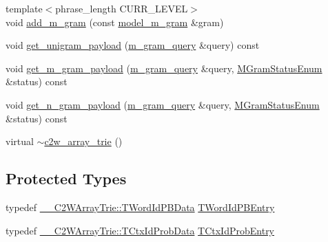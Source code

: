 \begin{DoxyCompactItemize}
\item 
{\footnotesize template$<$phrase\+\_\+length C\+U\+R\+R\+\_\+\+L\+E\+V\+E\+L$>$ }\\void \hyperlink{classuva_1_1smt_1_1bpbd_1_1server_1_1lm_1_1c2w__array__trie_a8bfd215aa7204721868fc9fff3dc12ed}{add\+\_\+m\+\_\+gram} (const \hyperlink{classuva_1_1smt_1_1bpbd_1_1server_1_1lm_1_1m__grams_1_1model__m__gram}{model\+\_\+m\+\_\+gram} \&gram)
\item 
void \hyperlink{classuva_1_1smt_1_1bpbd_1_1server_1_1lm_1_1c2w__array__trie_a00b9ca02069871c5a412146ac232a9c2}{get\+\_\+unigram\+\_\+payload} (\hyperlink{classuva_1_1smt_1_1bpbd_1_1server_1_1lm_1_1m__gram__query}{m\+\_\+gram\+\_\+query} \&query) const 
\item 
void \hyperlink{classuva_1_1smt_1_1bpbd_1_1server_1_1lm_1_1c2w__array__trie_aa72798c688fe41438024f6620e68d0c9}{get\+\_\+m\+\_\+gram\+\_\+payload} (\hyperlink{classuva_1_1smt_1_1bpbd_1_1server_1_1lm_1_1m__gram__query}{m\+\_\+gram\+\_\+query} \&query, \hyperlink{namespaceuva_1_1smt_1_1bpbd_1_1server_1_1lm_ab9b3e7382b561dcb8abcd6b55e9b796a}{M\+Gram\+Status\+Enum} \&status) const 
\item 
void \hyperlink{classuva_1_1smt_1_1bpbd_1_1server_1_1lm_1_1c2w__array__trie_aadeccaf603d3d9ae0c4f5f99db252f30}{get\+\_\+n\+\_\+gram\+\_\+payload} (\hyperlink{classuva_1_1smt_1_1bpbd_1_1server_1_1lm_1_1m__gram__query}{m\+\_\+gram\+\_\+query} \&query, \hyperlink{namespaceuva_1_1smt_1_1bpbd_1_1server_1_1lm_ab9b3e7382b561dcb8abcd6b55e9b796a}{M\+Gram\+Status\+Enum} \&status) const 
\item 
virtual \hyperlink{classuva_1_1smt_1_1bpbd_1_1server_1_1lm_1_1c2w__array__trie_aa6b5ffd0fa902f0c79c750e109a4c881}{$\sim$c2w\+\_\+array\+\_\+trie} ()
\end{DoxyCompactItemize}
\subsection*{Protected Types}
\begin{DoxyCompactItemize}
\item 
typedef \hyperlink{structuva_1_1smt_1_1bpbd_1_1server_1_1lm_1_1_____c2_w_array_trie_1_1_t_word_id_p_b_data}{\+\_\+\+\_\+\+C2\+W\+Array\+Trie\+::\+T\+Word\+Id\+P\+B\+Data} \hyperlink{classuva_1_1smt_1_1bpbd_1_1server_1_1lm_1_1c2w__array__trie_aa01859d7132d0da6ca72acacb42f9762}{T\+Word\+Id\+P\+B\+Entry}
\item 
typedef \hyperlink{structuva_1_1smt_1_1bpbd_1_1server_1_1lm_1_1_____c2_w_array_trie_1_1_t_ctx_id_prob_data}{\+\_\+\+\_\+\+C2\+W\+Array\+Trie\+::\+T\+Ctx\+Id\+Prob\+Data} \hyperlink{classuva_1_1smt_1_1bpbd_1_1server_1_1lm_1_1c2w__array__trie_a1240bfbdc6bbb632c56970ae4d6acf91}{T\+Ctx\+Id\+Prob\+Entry}
\end{DoxyCompactItemize}
